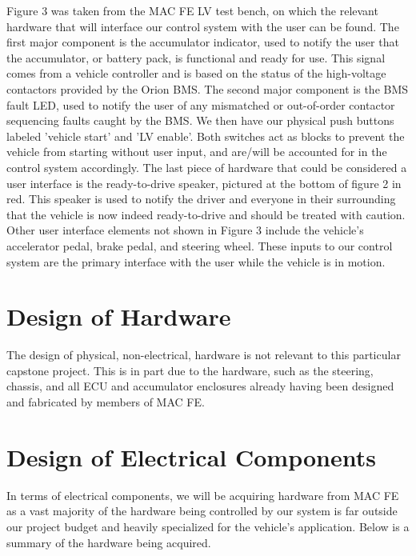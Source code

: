 \documentclass[12pt, titlepage]{article}
\begin{document}
Figure 3 was taken from the MAC FE LV test bench, on which the relevant hardware that will interface our control system with the user can be found. The first major component is the accumulator indicator, used to notify the user that the accumulator, or battery pack, is functional and ready for use. This signal comes from a vehicle controller and is based on the status of the high-voltage contactors provided by the Orion BMS. The second major component is the BMS fault LED, used to notify the user of any mismatched or out-of-order contactor sequencing faults caught by the BMS. We then have our physical push buttons labeled 'vehicle start' and 'LV enable'. Both switches act as blocks to prevent the vehicle from starting without user input, and are/will be accounted for in the control system accordingly. The last piece of hardware that could be considered a user interface is the ready-to-drive speaker, pictured at the bottom of figure 2 in red. This speaker is used to notify the driver and everyone in their surrounding that the vehicle is now indeed ready-to-drive and should be treated with caution.
Other user interface elements not shown in Figure 3 include the vehicle's accelerator pedal, brake pedal, and steering wheel. These inputs to our control system are the primary interface with the user while the vehicle is in motion.

\section{Design of Hardware}
The design of physical, non-electrical, hardware is not relevant to this particular capstone project. This is in part due to the hardware, such as the steering, chassis, and all ECU and accumulator enclosures already having been designed and fabricated by members of MAC FE.

\section{Design of Electrical Components}
In terms of electrical components, we will be acquiring hardware from MAC FE as a vast majority of the hardware being controlled by our system is far outside our project budget and heavily specialized for the vehicle's application. Below is a summary of the hardware being acquired.
\end{document}
